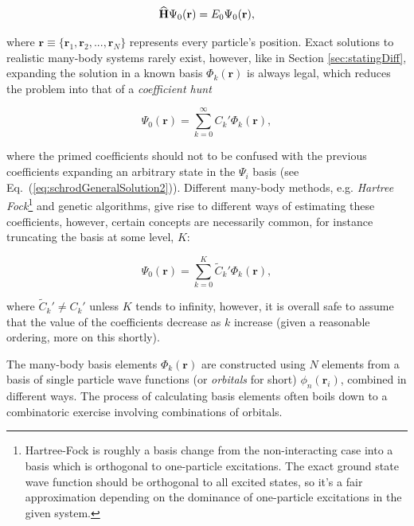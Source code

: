 \begin{equation}
 {\bf\widehat{H}}\Psi_0(\mathbf{r}) = E_0\Psi_0(\mathbf{r}),
 \end{equation}
 
where $\mathbf{r} \equiv \{\mathbf{r}_1, \mathbf{r}_2, ..., \mathbf{r}_N\}$ represents every particle's position. Exact solutions to realistic many-body systems rarely exist, however, like in Section \ref{sec:statingDiff}, expanding the solution in a known basis $\Phi_k(\mathbf{r})$ is always legal, which reduces the problem into that of a \textit{coefficient hunt} 

\begin{equation}
\label{eq:manyBodyExp}
 \Psi_0(\mathbf{r}) = \sum_{k=0}^\infty C_k'\Phi_k(\mathbf{r}),
\end{equation}

where the primed coefficients should not to be confused with the previous coefficients expanding an arbitrary state in the $\Psi_i$ basis (see Eq.~(\ref{eq:schrodGeneralSolution2})). Different many-body methods, e.g. \textit{Hartree Fock}\footnote{Hartree-Fock is roughly a basis change from the non-interacting case into a basis which is orthogonal to one-particle excitations. The exact ground state wave function should be orthogonal to all excited states, so it's a fair approximation depending on the dominance of one-particle excitations in the given system.} and genetic algorithms, give rise to different ways of estimating these coefficients, however, certain concepts are necessarily common, for instance truncating the basis at some level, $K$:

\begin{equation}
 \Psi_0(\mathbf{r}) = \sum_{k=0}^K \tilde{C}_k'\Phi_k(\mathbf{r}), \label{eq:manybodyWFexp}
\end{equation}

where $ \tilde{C}_k' \ne  C_k'$ unless $K$ tends to infinity, however, it is overall safe to assume that the value of the coefficients decrease as $k$ increase (given a reasonable ordering, more on this shortly). 

The many-body basis elements $\Phi_k(\mathbf{r})$ are constructed using $N$ elements from a basis of single particle wave functions (or \textit{orbitals} for short) $\phi_n(\mathbf{r}_i)$, combined in different ways. The process of calculating basis elements often boils down to a combinatoric exercise involving combinations of orbitals.

